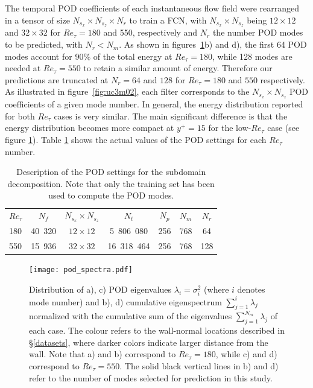 The temporal POD coefficients of each instantaneous flow field were rearranged in a tensor of size $N_{s_x}\times N_{s_z}\times N_r$ to train a FCN, with $N_{s_x}\times N_{s_z}$ being $12\times12$ and $32\times32$ for $Re_{\tau} = 180$ and 550, respectively and $N_r$ the number POD modes to be predicted, with $N_{r}<N_{m}$.
As shown in figures~\ref{fig:uc3m01}b) and d), the first 64 POD modes account for $90\%$ of the total energy at $Re_{\tau}=180$, while 128 modes are needed at $Re_{\tau}=550$ to retain a similar amount of energy.
Therefore our predictions are truncated at $N_{r}=64$ and $128$ for $Re_{\tau}=180$ and $550$ respectively.
As illustrated in figure~\ref{fig:uc3m02}, each filter corresponds to the $N_{s_x}\times N_{s_z}$ POD coefficients of a given mode number.
In general, the energy distribution reported for both $Re_{\tau}$ cases is very similar.
The main significant difference is that the energy distribution becomes more compact at $y^+=15$ for the low-$Re_{\tau}$ case (see figure \ref{fig:uc3m01}).
Table \ref{tab:pod} shows the actual values of the POD settings for each $Re_{\tau}$ number.

\begin{table}
\begin{center}
    \begin{tabular}{l cccccc}
    $Re_{\tau}$ & $N_f$ & $N_{s_x}\times N_{s_z}$ & $N_t$ & $N_p$ & $N_m$ & $N_r$  \\[0.3cm]

        180 & 40~320 & $12 \times 12$ & \phantom{0}5~806~080 & 256 & 768 &  64                           \\
        550 & 15~936 & $32 \times 32$ & 16~318~464 & 256 & 768           & 128                           \\

    \end{tabular}
    \caption{Description of the POD settings for the subdomain decomposition. Note that only the training set has been used to compute the POD modes.}
    \label{tab:pod}
\end{center}
\end{table}

\begin{figure}
    \centerline{\texttt{[image: pod\_spectra.pdf]}}
    \caption{Distribution of a), c) POD eigenvalues $\lambda_{i}=\sigma_i^2$ (where $i$ denotes mode number) and b), d) cumulative eigenspectrum $\sum_{j=1}^{i}\lambda_j$ normalized with the cumulative sum of the eigenvalues $\sum_{j=1}^{N_m}\lambda_j$ of each case. The colour refers to the wall-normal locations described in \S\ref{datasets}, where darker colors indicate larger distance from the wall. Note that a) and b) correspond to $Re_{\tau} = 180$, while c) and d) correspond to $Re_{\tau} = 550$. The solid black vertical lines in b) and d) refer to the number of modes selected for prediction in this study.}
    \label{fig:uc3m01}
\end{figure}

